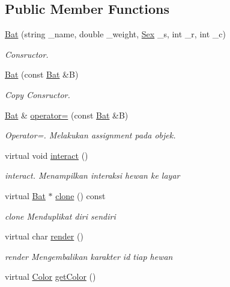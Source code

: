 \subsection*{Public Member Functions}
\begin{DoxyCompactItemize}
\item 
\hyperlink{classBat_a0c530d84bcd47df69423446f42432b08}{Bat} (string \+\_\+name, double \+\_\+weight, \hyperlink{sex_8h_a2633cb393c68bb2ee8080db58fb7ba93}{Sex} \+\_\+s, int \+\_\+r, int \+\_\+c)
\begin{DoxyCompactList}\small\item\em Consructor. \end{DoxyCompactList}\item 
\hyperlink{classBat_acf84d45e08e801386877838426746725}{Bat} (const \hyperlink{classBat}{Bat} \&B)
\begin{DoxyCompactList}\small\item\em Copy Consructor. \end{DoxyCompactList}\item 
\hyperlink{classBat}{Bat} \& \hyperlink{classBat_a63fbad7b887f510a807f03950cd44af6}{operator=} (const \hyperlink{classBat}{Bat} \&B)
\begin{DoxyCompactList}\small\item\em Operator=. Melakukan assignment pada objek. \end{DoxyCompactList}\item 
virtual void \hyperlink{classBat_adf63bb33699532d83e680252c4b7021c}{interact} ()
\begin{DoxyCompactList}\small\item\em interact. Menampilkan interaksi hewan ke layar \end{DoxyCompactList}\item 
virtual \hyperlink{classBat}{Bat} $\ast$ \hyperlink{classBat_a424595b4e6c12819cc4b1a4083c756cb}{clone} () const 
\begin{DoxyCompactList}\small\item\em clone Menduplikat diri sendiri \end{DoxyCompactList}\item 
virtual char \hyperlink{classBat_a53f34e24e9247fb195c4114e53920bc3}{render} ()
\begin{DoxyCompactList}\small\item\em render Mengembalikan karakter id tiap hewan \end{DoxyCompactList}\item 
virtual \hyperlink{color_8h_ab87bacfdad76e61b9412d7124be44c1c}{Color} \hyperlink{classBat_a7f75f3924791ba21aef97876aed26475}{get\+Color} ()

\end{DoxyCompactItemize}
